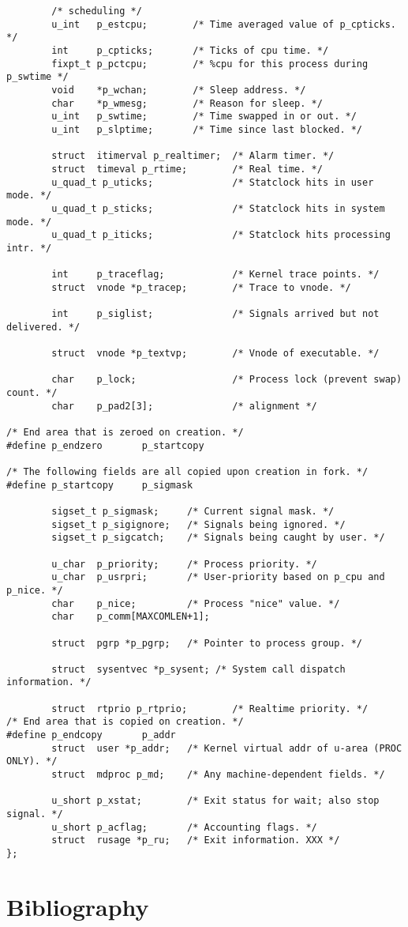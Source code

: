 \documentclass[10pt,letterpaper,onecolumn,draftclsnofoot]{IEEEtran}
\begin{document}
\begin{lstlisting}
        /* scheduling */
        u_int   p_estcpu;        /* Time averaged value of p_cpticks. */
        int     p_cpticks;       /* Ticks of cpu time. */
        fixpt_t p_pctcpu;        /* %cpu for this process during p_swtime */
        void    *p_wchan;        /* Sleep address. */
        char    *p_wmesg;        /* Reason for sleep. */
        u_int   p_swtime;        /* Time swapped in or out. */
        u_int   p_slptime;       /* Time since last blocked. */

        struct  itimerval p_realtimer;  /* Alarm timer. */
        struct  timeval p_rtime;        /* Real time. */
        u_quad_t p_uticks;              /* Statclock hits in user mode. */
        u_quad_t p_sticks;              /* Statclock hits in system mode. */
        u_quad_t p_iticks;              /* Statclock hits processing intr. */

        int     p_traceflag;            /* Kernel trace points. */
        struct  vnode *p_tracep;        /* Trace to vnode. */

        int     p_siglist;              /* Signals arrived but not delivered. */

        struct  vnode *p_textvp;        /* Vnode of executable. */

        char    p_lock;                 /* Process lock (prevent swap) count. */
        char    p_pad2[3];              /* alignment */

/* End area that is zeroed on creation. */
#define p_endzero       p_startcopy

/* The following fields are all copied upon creation in fork. */
#define p_startcopy     p_sigmask

        sigset_t p_sigmask;     /* Current signal mask. */
        sigset_t p_sigignore;   /* Signals being ignored. */
        sigset_t p_sigcatch;    /* Signals being caught by user. */

        u_char  p_priority;     /* Process priority. */
        u_char  p_usrpri;       /* User-priority based on p_cpu and p_nice. */
        char    p_nice;         /* Process "nice" value. */
        char    p_comm[MAXCOMLEN+1];

        struct  pgrp *p_pgrp;   /* Pointer to process group. */

        struct  sysentvec *p_sysent; /* System call dispatch information. */

        struct  rtprio p_rtprio;        /* Realtime priority. */
/* End area that is copied on creation. */
#define p_endcopy       p_addr
        struct  user *p_addr;   /* Kernel virtual addr of u-area (PROC ONLY). */
        struct  mdproc p_md;    /* Any machine-dependent fields. */

        u_short p_xstat;        /* Exit status for wait; also stop signal. */
        u_short p_acflag;       /* Accounting flags. */
        struct  rusage *p_ru;   /* Exit information. XXX */
};
\end{lstlisting}
\section{Bibliography}



\end{document}
